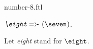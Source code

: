 \documentclass{stex}
\begin{document}
\begin{smodule}{number-8.ftl}



\begin{definition}[forthel,id=EightDef]
  $\emph{\eight} = \succ(\seven)$.

  Let \emph{eight} stand for $\eight$.
\end{definition}

\end{smodule}
\end{document}
